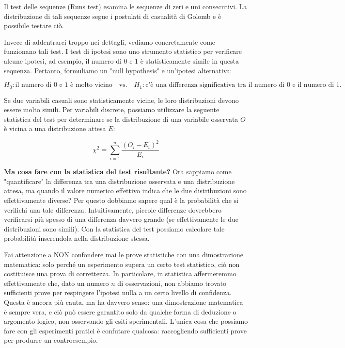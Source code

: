 \documentclass[11pt]{article}
\theoremstyle{definition} \newtheorem{definizione}{Definizione}[section] %
\begin{document}
        Il test delle sequenze (Runs test) esamina le sequenze di zeri e uni consecutivi. La distribuzione di tali sequenze segue i postulati di casualità di Golomb e è possibile testare ciò.

        Invece di addentrarci troppo nei dettagli, vediamo concretamente come funzionano tali test. I test di ipotesi sono uno strumento statistico per verificare alcune ipotesi, ad esempio, il numero di 0 e 1 è statisticamente simile in questa sequenza. Pertanto, formuliamo un "null hypothesis" e un'ipotesi alternativa:

        \[H_0 : \text{il numero di 0 e 1 è molto vicino} \quad \text{vs.} \quad H_1 : \text{c'è una differenza significativa tra il numero di 0 e il numero di 1}.\]

        Se due variabili casuali sono statisticamente vicine, le loro distribuzioni devono essere molto simili. Per variabili discrete, possiamo utilizzare la seguente statistica del test per determinare se la distribuzione di una variabile osservata \(O\) è vicina a una distribuzione attesa \(E\):

        \[\chi^2 = \sum_{i=1}^{n} \frac{(O_i - E_i)^2}{E_i}\]

        \textbf{Ma cosa fare con la statistica del test risultante?} Ora sappiamo come "quantificare" la differenza tra una distribuzione osservata e una distribuzione attesa, ma quando il valore numerico effettivo indica che le due distribuzioni sono effettivamente diverse?
        Per questo dobbiamo sapere qual è la probabilità che si verifichi una tale differenza. Intuitivamente, piccole differenze dovrebbero verificarsi più spesso di una differenza davvero grande (se effettivamente le due distribuzioni sono simili).
        Con la statistica del test possiamo calcolare tale probabilità inserendola nella distribuzione stessa.

        
        Fai attenzione a NON confondere mai le prove statistiche con una dimostrazione matematica: solo perché un esperimento supera un certo test statistico, ciò non costituisce una prova di correttezza.
        In particolare, in statistica affermeremmo effettivamente che, dato un numero \(n\) di osservazioni, non abbiamo trovato sufficienti prove per respingere l'ipotesi nulla a un certo livello di confidenza.
        Questa è ancora più cauta, ma ha davvero senso: una dimostrazione matematica è sempre vera, e ciò può essere garantito solo da qualche forma di deduzione o argomento logico, non osservando gli esiti sperimentali. L'unica cosa che possiamo fare con gli esperimenti pratici è confutare qualcosa: raccogliendo sufficienti prove per produrre un controesempio.

            
            
\end{document}
